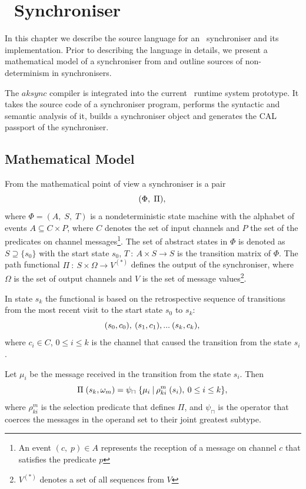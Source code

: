 \chapter{\ak\ Synchroniser}
In this chapter we describe the source language for an \ak\ synchroniser and its implementation. Prior to describing the language in details, we present a mathematical model of a synchroniser from \cite{astrakahn} and outline sources of non-determinism in synchronisers.

The $aksync$ compiler is integrated into the current \ak\ runtime system prototype. It takes the source code of a synchroniser program, performs the syntactic and semantic analysis of it, builds a synchroniser object and generates the CAL passport of the synchroniser.


    \section{Mathematical Model}
From the mathematical point of view a synchroniser is a pair
\begin{equation}
(\Phi, \; \Pi),\\\nonumber
\end{equation}
where $\Phi = (A, \; S, \; T)$ is a nondeterministic state machine with the alphabet of events $A \subseteq C \times P$, where $C$ denotes the set of input channels and $P$ the set of the predicates on channel messages\footnote{An event $(c, \; p) \in A$ represents the reception of a message on channel $c$ that satisfies the predicate $p$}. The set of abstract states in $\Phi$ is denoted as $S \supseteq \{s_{0}\}$ with the start state $s_{0}$, $T \: : \: A \times S \to S$ is the transition matrix of $\Phi$. The path functional $\Pi \: : \: S \times \Omega \to V^{(*)}$ defines the output of the synchroniser, where $\Omega$ is the set of output channels and $V$ is the set of message values\footnote{$V^{(*)}$ denotes a set of all sequences from $V$}.

In state $s_{k}$ the functional is based on the retrospective sequence of transitions from the most recent visit to the start state $s_{0}$ to $s_{k}$:
\begin{equation}
(s_{0}, c_{0}), \: (s_{1}, c_{1}),... \: (s_{k}, c_{k}),\\\nonumber
\end{equation}
where $c_{i} \in C$, $0 \le i \le k$ is the channel that caused the transition from the state $s_{i}$.

Let $\mu_{i}$ be the message received in the transition from the state $s_{i}$. Then
\begin{equation}
\Pi \; (s_{k}, \omega_{m}) = \psi_{\sqcap} \; \{\mu_{i} \: | \: \rho_{ki}^{m} \; (s_{i}), \: 0 \le i \le k\},\\\label{predic}
\end{equation}
where $\rho_{ki}^{m}$ is the selection predicate that defines $\Pi$, and $\psi_{\sqcap}$ is the operator that coerces the messages in the operand set to their joint greatest subtype.

